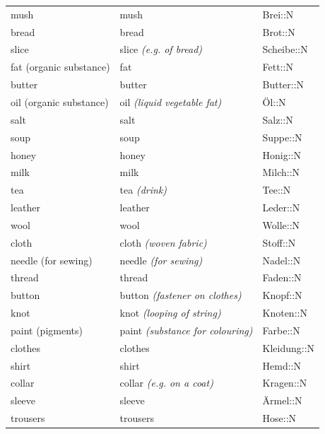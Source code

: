 \begin{center}
\begin{longtable}{lll}
{\sc \lowercase{	MUSH	}}	&	mush		&	Brei::N	\\
{\sc \lowercase{	BREAD	}}	&	bread		&	Brot::N	\\
{\sc \lowercase{	SLICE	}}	&	slice	\textit{\footnotesize (e.g. of bread)}	&	Scheibe::N	\\
{\sc \lowercase{	FAT \footnotesize (ORGANIC SUBSTANCE)	}}	&	fat		&	Fett::N	\\
{\sc \lowercase{	BUTTER	}}	&	butter		&	Butter::N	\\
{\sc \lowercase{	OIL \footnotesize (ORGANIC SUBSTANCE)	}}	&	oil	\textit{\footnotesize (liquid vegetable fat)}	&	Öl::N	\\
{\sc \lowercase{	SALT	}}	&	salt		&	Salz::N	\\
{\sc \lowercase{	SOUP	}}	&	soup		&	Suppe::N	\\
{\sc \lowercase{	HONEY	}}	&	honey		&	Honig::N	\\
{\sc \lowercase{	MILK	}}	&	milk		&	Milch::N	\\
{\sc \lowercase{	TEA	}}	&	tea	\textit{\footnotesize (drink)}	&	Tee::N	\\
{\sc \lowercase{	LEATHER	}}	&	leather		&	Leder::N	\\
{\sc \lowercase{	WOOL	}}	&	wool		&	Wolle::N	\\
{\sc \lowercase{	CLOTH	}}	&	cloth	\textit{\footnotesize (woven fabric)}	&	Stoff::N	\\
{\sc \lowercase{	NEEDLE \footnotesize (FOR SEWING)	}}	&	needle	\textit{\footnotesize (for sewing)}	&	Nadel::N	\\
{\sc \lowercase{	THREAD	}}	&	thread		&	Faden::N	\\
{\sc \lowercase{	BUTTON	}}	&	button	\textit{\footnotesize (fastener on clothes)}	&	Knopf::N	\\
{\sc \lowercase{	KNOT	}}	&	knot	\textit{\footnotesize (looping of string)}	&	Knoten::N	\\
{\sc \lowercase{	PAINT \footnotesize (PIGMENTS)	}}	&	paint	\textit{\footnotesize (substance for colouring)}	&	Farbe::N	\\
{\sc \lowercase{	CLOTHES	}}	&	clothes		&	Kleidung::N	\\
{\sc \lowercase{	SHIRT	}}	&	shirt		&	Hemd::N	\\
{\sc \lowercase{	COLLAR	}}	&	collar	\textit{\footnotesize (e.g. on a coat)}	&	Kragen::N	\\
{\sc \lowercase{	SLEEVE	}}	&	sleeve		&	Ärmel::N	\\
{\sc \lowercase{	TROUSERS	}}	&	trousers		&	Hose::N	\\

\end{longtable}
\end{center}
